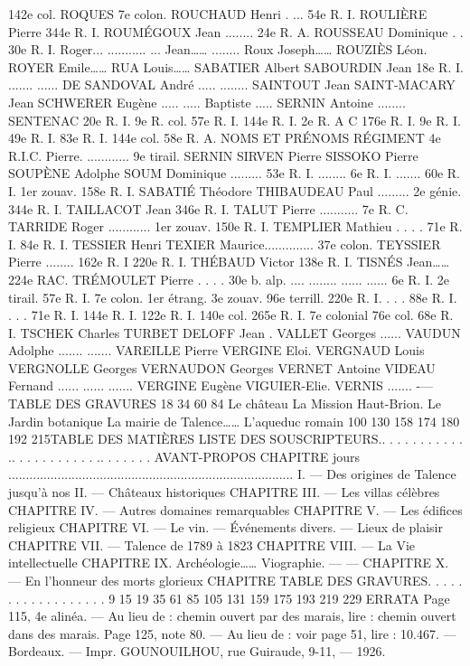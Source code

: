 \documentclass[a4paper,11pt]{book}
\begin{document}
142e col.
ROQUES
7e colon.
ROUCHAUD Henri . ...
54e R. I.
ROULIÈRE Pierre
344e R. I.
ROUMÉGOUX Jean ........ 24e R. A.
ROUSSEAU Dominique . . 30e R. I.
Roger...
...........
...
Jean……
........
Roux Joseph……
ROUZIÈS Léon.
ROYER Emile……
RUA Louis……
SABATIER Albert
SABOURDIN Jean
18e R. I.
.......
......
DE SANDOVAL André
.....
........
SAINTOUT Jean
SAINT-MACARY Jean
SCHWERER Eugène
.....
.....
Baptiste .....
SERNIN Antoine ........
SENTENAC
20e R. I.
9e R. col.
57e R. I.
144e R. I.
2e R. A C
176e R. I.
9e R. I.
49e R. I.
83e R. I.
144e col.
58e R. A.
NOMS ET PRÉNOMS
RÉGIMENT
4e R.I.C.
Pierre.
............ 9e tirail.
SERNIN
SIRVEN Pierre
SISSOKO Pierre
SOUPÈNE Adolphe
SOUM Dominique
......... 53e R. I.
........ 6e R. I.
....... 60e R. I.
1er zouav.
158e R. I.
SABATIÉ Théodore
THIBAUDEAU Paul ......... 2e génie.
344e R. I.
TAILLACOT Jean
346e R. I.
TALUT Pierre ...........
7e R. C.
TARRIDE Roger ............ 1er zouav.
150e R. I.
TEMPLIER Mathieu . . . . 71e R. I.
84e R. I.
TESSIER Henri
TEXIER Maurice.............. 37e colon.
TEYSSIER Pierre ........ 162e R. I
220e R. I.
THÉBAUD Victor
138e R. I.
TISNÉS Jean……
224e RAC.
TRÉMOULET Pierre . . . . 30e b. alp.
....
........
......
......
6e R. I.
2e tirail.
57e R. I.
7e colon.
1er étrang.
3e zouav.
96e terrill.
220e R. I.
. . . 88e R. I.
. . . 71e R. I.
144e R. I.
122e R. I.
140e col.
265e R. I.
7e colonial
76e col.
68e R. I.
TSCHEK Charles
TURBET DELOFF Jean
.
VALLET Georges
......
VAUDUN Adolphe .......
.......
VAREILLE Pierre
VERGINE Eloi.
VERGNAUD Louis
VERGNOLLE Georges
VERNAUDON Georges
VERNET Antoine
VIDEAU Fernand
......
......
.......
VERGINE Eugène
VIGUIER-Elie.
VERNIS
.......
-—TABLE DES GRAVURES
18
34
60
84
Le château La Mission Haut-Brion.
Le Jardin botanique
La mairie de
Talence……
L'aqueduc romain
100
130
158
174
180
192
215TABLE DES MATIÈRES
LISTE DES SOUSCRIPTEURS.. . . . . . . . . . . .. . . . . . . . . . . .. . . . . . .
AVANT-PROPOS
CHAPITRE
jours
.................................................................................
I. — Des origines de Talence jusqu'à nos
II. — Châteaux historiques
CHAPITRE III.
— Les villas célèbres
CHAPITRE IV.
— Autres domaines remarquables
CHAPITRE
V. — Les édifices religieux
CHAPITRE VI.
— Le vin. — Événements divers. — Lieux
de plaisir
CHAPITRE VII.
— Talence de 1789 à 1823
CHAPITRE VIII. — La Vie intellectuelle
CHAPITRE IX.
Archéologie……
Viographie.
—
—
CHAPITRE
X. — En l'honneur des morts glorieux
CHAPITRE
TABLE DES GRAVURES. . . . . . . . . . . . . . . . .
.
9
15
19
35
61
85
105
131
159
175
193
219
229
ERRATA
Page 115, 4e alinéa. — Au lieu de : chemin ouvert par des marais,
lire : chemin ouvert dans des marais.
Page 125, note 80. — Au lieu de : voir page 51, lire :
10.467. — Bordeaux. — Impr. GOUNOUILHOU, rue Guiraude, 9-11,
—
1926.
\end{document}
